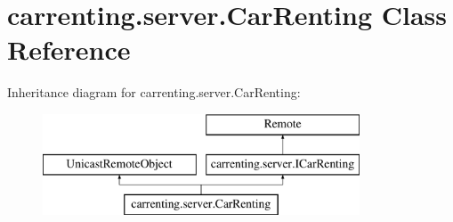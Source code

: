 \hypertarget{classcarrenting_1_1server_1_1_car_renting}{}\section{carrenting.\+server.\+Car\+Renting Class Reference}
\label{classcarrenting_1_1server_1_1_car_renting}
Inheritance diagram for carrenting.\+server.\+Car\+Renting\+:\begin{figure}[H]
\begin{center}
\leavevmode
\includegraphics[height=3.000000cm]{classcarrenting_1_1server_1_1_car_renting}
\end{center}
\end{figure}
